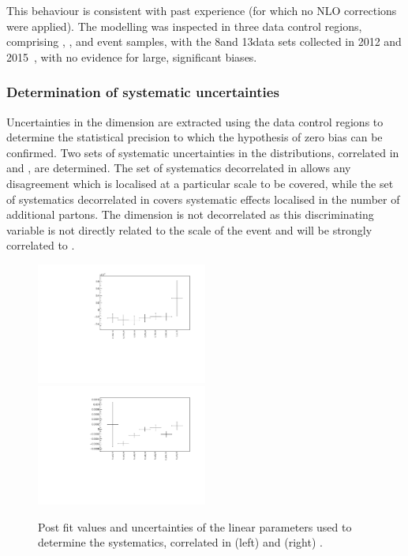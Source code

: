 This behaviour is consistent with past experience (for which no NLO
corrections were applied). The \HTmiss modelling was inspected in
three data control regions, comprising \mj, \mmj, and \gj event
samples, with the 8\TeV and 13\TeV data sets collected in 2012 and
2015~\cite{Khachatryan:2016dvc}, with no evidence for large,
significant biases.

\subsubsection{Determination of systematic uncertainties}

Uncertainties in the \mht dimension are extracted using the data
control regions to determine the statistical precision to which the
hypothesis of zero bias can be confirmed. Two sets of systematic
uncertainties in the \mht distributions, correlated in \scalht and
\njet, are determined. The set of systematics decorrelated in \scalht
allows any disagreement which is localised at a particular scale to be
covered, while the set of systematics decorrelated in \njet covers
systematic effects localised in the number of additional partons. The
\nb dimension is not decorrelated as this discriminating variable is
not directly related to the scale of the event and will be strongly
correlated to \njet.

\begin{figure}[h!]
  \centering
  \includegraphics[width=0.5\textwidth]{figures/mhtTemplate/exclusive_corr_njet/Mu_graph}~
  \includegraphics[width=0.5\textwidth]{figures/mhtTemplate/exclusive_corr_ht/Mu_graph}\\
  \caption{\label{fig:postFitMu} Post fit values and uncertainties of
    the linear parameters used to determine the systematics,
    correlated in (left) \njet and (right) \scalht.}
\end{figure}

